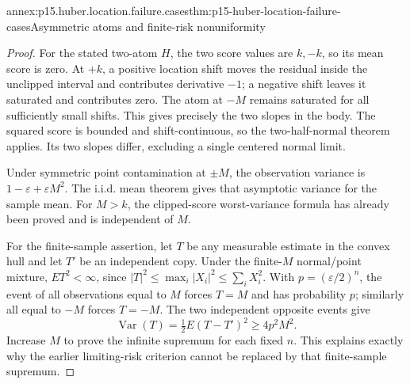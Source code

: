 \begin{annexitem}{annex:p15.huber.location.failure.cases}{thm:p15-huber-location-failure-cases}{Asymmetric atoms and finite-risk nonuniformity}
\begin{proof}
For the stated two-atom \(H\), the two score values are \(k,-k\),
so its mean score is zero. At \(+k\), a positive location shift
moves the residual inside the unclipped interval and contributes
derivative \(-1\); a negative shift leaves it saturated and
contributes zero. The atom at \(-M\) remains saturated for all
sufficiently small shifts. This gives precisely the two slopes
in the body. The squared score is bounded and shift-continuous,
so the two-half-normal theorem applies. Its two slopes differ,
excluding a single centered normal limit.

Under symmetric point contamination at \(\pm M\), the observation
variance is \(1-\varepsilon+\varepsilon M^2\).
The i.i.d. mean theorem gives that asymptotic variance for the
sample mean. For \(M>k\), the clipped-score worst-variance formula
has already been proved and is independent of \(M\).

For the finite-sample assertion, let \(T\) be any measurable estimate
in the convex hull and let \(T'\) be an independent copy.
Under the finite-\(M\) normal/point mixture, \(ET^2<\infty\), since
\(|T|^2\leq\max_i|X_i|^2\leq\sum_iX_i^2\).
With \(p=(\varepsilon/2)^n\), the event of all observations equal
to \(M\) forces \(T=M\) and has probability \(p\); similarly
all equal to \(-M\) forces \(T=-M\).
The two independent opposite events give
\[
 \operatorname{Var}(T)=\tfrac12E(T-T')^2
                        \geq4p^2M^2.
\]
Increase \(M\) to prove the infinite supremum for each fixed \(n\).
This explains exactly why the earlier limiting-risk criterion
cannot be replaced by that finite-sample supremum.
\end{proof}
\end{annexitem}

